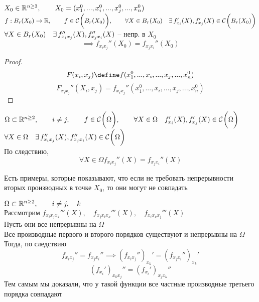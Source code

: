 \begin{implication}[для $ n > 2 $]
	$ X_0 \in \mathbb{R}^{n \ge 3}, \qquad X_0 = (x_1^0, ..., x_i^0, ..., x_j^0, ..., x_n^0) $ \\
	$ f : B_r(X_0) \to \mathbb{R}, \qquad f \in \mathcal{C}^{} \bigg( {B_r(X_0)} \bigg) , \qquad \forall X \in B_r(X_0) \quad \exists\, f_{x_i}'(X), f_{x_j}'(X) \in \mathcal{C}^{} \bigg( {B_r(X_0)} \bigg)  $ \\
	$ \forall X \in B_r(X_0) \quad \exists\, f_{x_ix_j}''(X), f_{x_jx_i}''(X) $ -- непр. в $ X_0 $
	$$ \implies f_{x_ix_j}''(X_0) = f_{x_jx_i}''(X_0) $$
\end{implication}

\begin{proof}
	$$ F(x_i, x_j) \define f(x_1^0, ..., x_i, ..., x_j, ..., x_n^0) $$
	$$ F_{x_ix_j}''(X_i, x_j) = f_{x_ix_j}''(x_1^0, ..., x_i, ..., x_j, ..., x_n^0) $$
\end{proof}

\begin{statement}
	$ \Omega \subset \mathbb{R}^{n \ge 2}, \qquad i \ne j, \qquad f \in \mathcal{C}^{} \bigg( {\Omega} \bigg) , \qquad \forall X \in \Omega \quad f_{x_i}'(X), f_{x_j}'(X) \in \mathcal{C}^{} \bigg( {\Omega} \bigg)  $ \\
	$ \forall X \in \Omega \quad \exists\, f_{x_ix_j}''(X), f_{x_jx_i}''(X) \in \mathcal{C}^{} \bigg( {\Omega} \bigg)  $ \\
	По следствию,
	$$ \forall X \in \Omega f_{x_ix_j}''(X) = f_{x_jx_i}''(X) $$
\end{statement}

\begin{remark}
	Есть примеры, которые показывают, что если не требовать непрерывности вторых производных в точке $ X_0 $, то они могут не совпадать
\end{remark}

\begin{statement}
	$ \Omega \subset \mathbb{R}^{n \ge 2}, \qquad i \ne j, \quad k $ \\
	Рассмотрим $ f_{x_ix_jx_k}'''(X), \quad f_{x_jx_ix_k}'''(X), \quad f_{x_ix_kx_j}'''(X) $ \\
	Пусть они все непрерывны на $ \Omega $ \\
	Все производные первого и второго порядков существуют и непрерывны на $ \Omega $ \\
	Тогда, по следствию
	$$ f_{x_ix_j}'' = f_{x_jx_i}'' \implies (f_{x_ix_j}'')_{x_k}' = (f_{x_jx_i}'')_{x_k}' $$
	$$ (f_{x_i}')_{x_kx_j}'' = (f_{x_i}')_{x_jx_k}'' $$
	Тем самым мы доказали, что у такой функции все частные производные третьего порядка совпадают
\end{statement}
